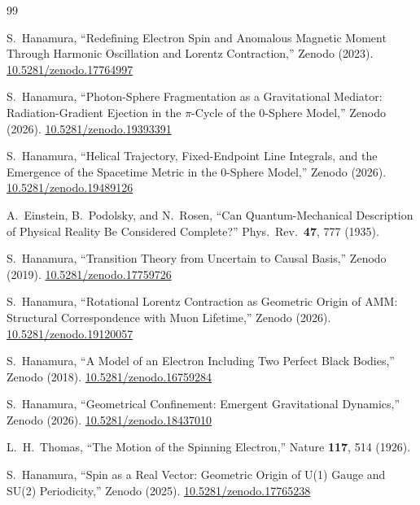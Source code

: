\documentclass[%
 reprint, amsmath,amssymb, aps, prb, ]{revtex4-2}
\numberwithin{equation}{section}
\begin{document}
\begin{thebibliography}{99}

 S.~Hanamura, ``Redefining Electron Spin and Anomalous Magnetic Moment Through Harmonic Oscillation and Lorentz Contraction,'' Zenodo (2023). \href{https://doi.org/10.5281/zenodo.17764997}{10.5281/zenodo.17764997}

 S.~Hanamura, ``Photon-Sphere Fragmentation as a Gravitational Mediator: Radiation-Gradient Ejection in the $\pi$-Cycle of the 0-Sphere Model,'' Zenodo (2026). \href{https://doi.org/10.5281/zenodo.19393391}{10.5281/zenodo.19393391}

 S.~Hanamura, ``Helical Trajectory, Fixed-Endpoint Line Integrals, and the Emergence of the Spacetime Metric in the 0-Sphere Model,'' Zenodo (2026). \href{https://doi.org/10.5281/zenodo.19489126}{10.5281/zenodo.19489126}

 A.~Einstein, B.~Podolsky, and N.~Rosen, ``Can Quantum-Mechanical Description of Physical Reality Be Considered Complete?'' Phys.\ Rev.\ \textbf{47}, 777 (1935).

 S.~Hanamura, ``Transition Theory from Uncertain to Causal Basis,'' Zenodo (2019). \href{https://doi.org/10.5281/zenodo.17759726}{10.5281/zenodo.17759726}

 S.~Hanamura, ``Rotational Lorentz Contraction as Geometric Origin of AMM: Structural Correspondence with Muon Lifetime,'' Zenodo (2026). \href{https://doi.org/10.5281/zenodo.19120057}{10.5281/zenodo.19120057}

 S.~Hanamura, ``A Model of an Electron Including Two Perfect Black Bodies,'' Zenodo (2018). \href{https://doi.org/10.5281/zenodo.16759284}{10.5281/zenodo.16759284}

 S.~Hanamura, ``Geometrical Confinement: Emergent Gravitational Dynamics,'' Zenodo (2026). \href{https://doi.org/10.5281/zenodo.18437010}{10.5281/zenodo.18437010}

 L.~H.~Thomas, ``The Motion of the Spinning Electron,'' Nature \textbf{117}, 514 (1926).

 S.~Hanamura, ``Spin as a Real Vector: Geometric Origin of U(1) Gauge and SU(2) Periodicity,'' Zenodo (2025). \href{https://doi.org/10.5281/zenodo.17765238}{10.5281/zenodo.17765238}


\end{thebibliography}
\end{document}
